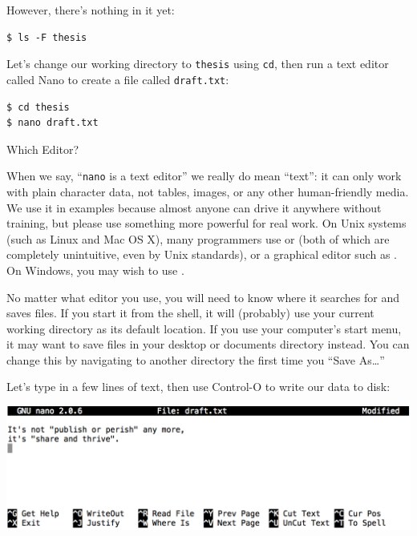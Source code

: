 \documentclass{book}
\begin{document}
However, there's nothing in it yet:

\begin{verbatim}
$ ls -F thesis
\end{verbatim}

Let's change our working directory to \texttt{thesis} using \texttt{cd},
then run a text editor called Nano to create a file called
\texttt{draft.txt}:

\begin{verbatim}
$ cd thesis
$ nano draft.txt
\end{verbatim}

\begin{swcbox}{Which Editor?}

When we say, ``\texttt{nano} is a text editor'' we really do mean
``text'': it can only work with plain character data, not tables,
images, or any other human-friendly media. We use it in examples because
almost anyone can drive it anywhere without training, but please use
something more powerful for real work. On Unix systems (such as Linux
and Mac OS X), many programmers use
 or
 (both of which are completely
unintuitive, even by Unix standards), or a graphical editor such as
. On Windows, you may wish
to use .

No matter what editor you use, you will need to know where it searches
for and saves files. If you start it from the shell, it will (probably)
use your current working directory as its default location. If you use
your computer's start menu, it may want to save files in your desktop or
documents directory instead. You can change this by navigating to
another directory the first time you ``Save As\ldots{}''

\end{swcbox}

Let's type in a few lines of text, then use Control-O to write our data
to disk:

\includegraphics{novice/shell/img/nano-screenshot.png}
\end{document}
